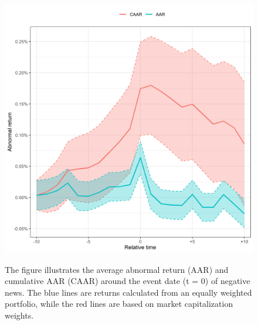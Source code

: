 \begin{figure}
\begin{minipage}[b]{0.49\textwidth}
    \includegraphics[width=\textwidth]{Projekt/1.Figures analysis/ST_positive_all_CI_nasdaq.png}
    \label{fig:ST_pos_sensitivity_nasdaq}
     \end{minipage}
        \caption*{\footnotesize The figure illustrates the average abnormal return (AAR) and cumulative AAR (CAAR) around the event date (t = 0) of negative news. The blue lines are returns calculated from an equally weighted portfolio, while the red lines are based on market capitalization weights.}
        
        \label{fig:three graphs}
\end{figure}
